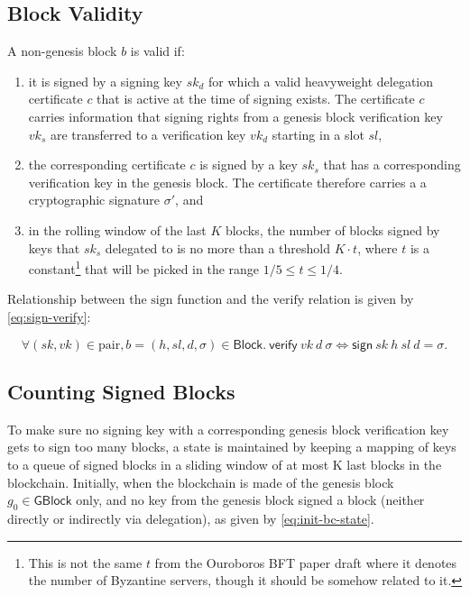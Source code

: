 \documentclass[11pt,a4paper]{article}
\newcommand{\var}[1]{\mathit{#1}}
\newcommand{\fun}[1]{\mathsf{#1}}
\newcommand{\type}[1]{\mathsf{#1}}
\newcommand{\GBlock}{\type{GBlock}}
\newcommand{\Block}{\type{Block}}
\newcommand{\signname}{sign}
\newcommand{\verifyname}{verify}
\newcommand{\keypairname}{pair}
\newcommand{\sign}[4]{\fun{\signname}\ #1 ~ #2 ~ #3 ~ #4}
\newcommand{\verify}[3]{\fun{\verifyname} ~ #1 ~ #2 ~ #3}
\begin{document}
\subsection{Block Validity}
\label{sec:block-valid}

A non-genesis block $\var{b}$ is valid if:
%
\begin{enumerate}
\item it is signed by a signing key $sk_d$ for which a valid heavyweight
  delegation certificate $c$ that is active at the time of signing exists.
  The certificate $c$ carries information that signing rights from a genesis
  block verification key $vk_s$ are transferred to a verification key $vk_d$
  starting in a slot $sl$,
\item the corresponding certificate $c$ is signed by a key $sk_s$ that has a
  corresponding verification key in the genesis block.
  The certificate therefore carries a a cryptographic signature $\sigma'$,
  and
\item in the rolling window of the last $K$ blocks, the number of blocks
  signed by keys that $sk_s$ delegated to is no more than a threshold
  $K \cdot t$, where $t$ is a constant\footnote{This is not the same $t$ from
    the Ouroboros BFT paper draft where it denotes the number of Byzantine
    servers, though it should be somehow related to it.}  that will be picked
  in the range $1/5 \leq t \leq 1/4$.
\end{enumerate}

Relationship between the $\text{\signname}$ function and the
$\text{\verifyname}$ relation is given by \eqref{eq:sign-verify}:

\begin{equation}
  \label{eq:sign-verify}
  \forall (sk, vk) \in \text{\keypairname}, b = (h, sl, d, \sigma) \in \Block.\
  \verify{vk}{d}{\sigma} \iff \sign{sk}{h}{sl}{d} = \sigma.
\end{equation}


\subsection{Counting Signed Blocks}
\label{sec:counting-signed-blocks}

To make sure no signing key with a corresponding genesis block verification
key gets to sign too many blocks, a state is maintained by keeping a mapping
of keys to a queue of signed blocks in a sliding window of at most K last
blocks in the blockchain.
%
Initially, when the blockchain is made of the genesis block $g_0 \in \GBlock$
only, and no key from the genesis block signed a block (neither directly or
indirectly via delegation), as given by \eqref{eq:init-bc-state}.
\end{document}
